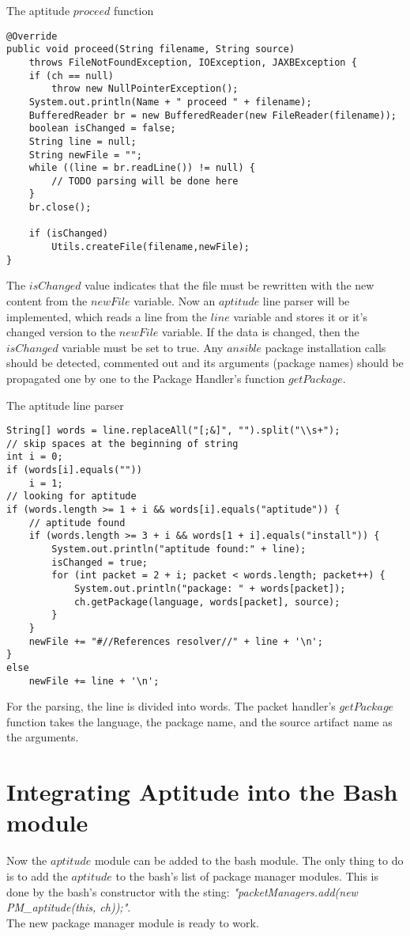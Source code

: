 \begin{Listing} 
\caption{The aptitude $proceed$ function}
\label{lst:aptit_proceed}
\begin{lstlisting}
@Override
public void proceed(String filename, String source)
	throws FileNotFoundException, IOException, JAXBException {
	if (ch == null)
		throw new NullPointerException();
	System.out.println(Name + " proceed " + filename);
	BufferedReader br = new BufferedReader(new FileReader(filename));
	boolean isChanged = false;
	String line = null;
	String newFile = "";
	while ((line = br.readLine()) != null) {
		// TODO parsing will be done here
	}
	br.close();

	if (isChanged)
		Utils.createFile(filename,newFile);
}	 
\end{lstlisting}
\end{Listing} 
The $isChanged$ value indicates that the file must be rewritten with the new content from the $newFile$ variable.
Now an $aptitude$ line parser will be implemented, which reads a line from the $line$ variable and stores it or it's changed version to the $newFile$ variable.
If the data is changed, then the $isChanged$ variable must be set to true.
Any $ansible$ package installation calls should be detected, commented out and its arguments (package names) should be propagated one by one to the Package Handler's function $getPackage$.
\begin{Listing} 
\caption{The aptitude line parser}
\label{lst:aptit_parse}
\begin{lstlisting}
String[] words = line.replaceAll("[;&]", "").split("\\s+");
// skip spaces at the beginning of string
int i = 0;
if (words[i].equals(""))
	i = 1;
// looking for aptitude 
if (words.length >= 1 + i && words[i].equals("aptitude")) {
	// aptitude found
	if (words.length >= 3 + i && words[1 + i].equals("install")) {
		System.out.println("aptitude found:" + line);
		isChanged = true;
		for (int packet = 2 + i; packet < words.length; packet++) {
			System.out.println("package: " + words[packet]);
			ch.getPackage(language, words[packet], source);
		}
	}
	newFile += "#//References resolver//" + line + '\n';
} 
else
	newFile += line + '\n';
\end{lstlisting}
\end{Listing} 
For the parsing, the line is divided into words. 
The packet handler's  $getPackage$ function takes the language, the package name, and the source artifact name as the arguments.

\section{Integrating Aptitude into the Bash module}\label{sec:aptitude_int}
Now the $aptitude$ module can be added to the bash module.
The only thing to do is to add the $aptitude$ to the bash's list of package manager modules.
This is done by the bash's constructor with the sting: \emph{"packetManagers.add(new PM\_aptitude(this, ch));"}.\\
The new package manager module is ready to work.
